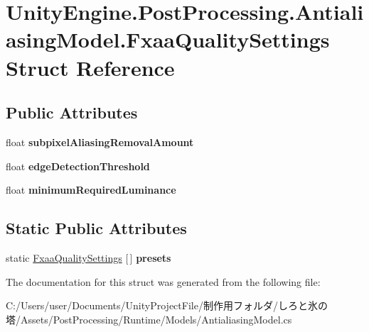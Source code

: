 \hypertarget{struct_unity_engine_1_1_post_processing_1_1_antialiasing_model_1_1_fxaa_quality_settings}{}\section{Unity\+Engine.\+Post\+Processing.\+Antialiasing\+Model.\+Fxaa\+Quality\+Settings Struct Reference}
\label{struct_unity_engine_1_1_post_processing_1_1_antialiasing_model_1_1_fxaa_quality_settings}
\subsection*{Public Attributes}
\begin{DoxyCompactItemize}
\item 
\mbox{\label{struct_unity_engine_1_1_post_processing_1_1_antialiasing_model_1_1_fxaa_quality_settings_ac514fdce358d2574ff6077c396d6f21e}} 
float {\bfseries subpixel\+Aliasing\+Removal\+Amount}
\item 
\mbox{\label{struct_unity_engine_1_1_post_processing_1_1_antialiasing_model_1_1_fxaa_quality_settings_acdbd8b0638ef670b1cf306486c37224c}} 
float {\bfseries edge\+Detection\+Threshold}
\item 
\mbox{\label{struct_unity_engine_1_1_post_processing_1_1_antialiasing_model_1_1_fxaa_quality_settings_a9d0a9883141d960b0e9e84aa08d4f287}} 
float {\bfseries minimum\+Required\+Luminance}
\end{DoxyCompactItemize}
\subsection*{Static Public Attributes}
\begin{DoxyCompactItemize}
\item 
\mbox{\label{struct_unity_engine_1_1_post_processing_1_1_antialiasing_model_1_1_fxaa_quality_settings_aa0de93d00805e6023393a52a6434a3b6}} 
static \hyperlink{struct_unity_engine_1_1_post_processing_1_1_antialiasing_model_1_1_fxaa_quality_settings}{Fxaa\+Quality\+Settings} \mbox{[}$\,$\mbox{]} {\bfseries presets}
\end{DoxyCompactItemize}


The documentation for this struct was generated from the following file\+:\begin{DoxyCompactItemize}
\item 
C\+:/\+Users/user/\+Documents/\+Unity\+Project\+File/制作用フォルダ/しろと氷の塔/\+Assets/\+Post\+Processing/\+Runtime/\+Models/Antialiasing\+Model.\+cs\end{DoxyCompactItemize}
